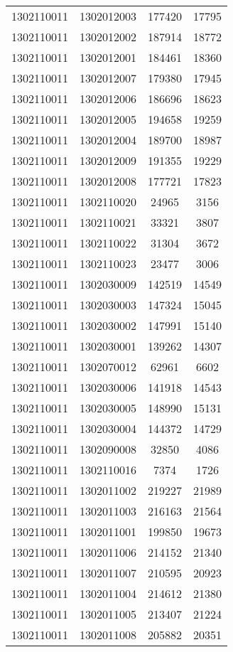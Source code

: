 \begin{longtable}[h]{llcc}
		1302110011 & 1302012003 & 177420 & 17795\\
		1302110011 & 1302012002 & 187914 & 18772\\
		1302110011 & 1302012001 & 184461 & 18360\\
		1302110011 & 1302012007 & 179380 & 17945\\
		1302110011 & 1302012006 & 186696 & 18623\\
		1302110011 & 1302012005 & 194658 & 19259\\
		1302110011 & 1302012004 & 189700 & 18987\\
		1302110011 & 1302012009 & 191355 & 19229\\
		1302110011 & 1302012008 & 177721 & 17823\\
		1302110011 & 1302110020 & 24965 & 3156\\
		1302110011 & 1302110021 & 33321 & 3807\\
		1302110011 & 1302110022 & 31304 & 3672\\
		1302110011 & 1302110023 & 23477 & 3006\\
		1302110011 & 1302030009 & 142519 & 14549\\
		1302110011 & 1302030003 & 147324 & 15045\\
		1302110011 & 1302030002 & 147991 & 15140\\
		1302110011 & 1302030001 & 139262 & 14307\\
		1302110011 & 1302070012 & 62961 & 6602\\
		1302110011 & 1302030006 & 141918 & 14543\\
		1302110011 & 1302030005 & 148990 & 15131\\
		1302110011 & 1302030004 & 144372 & 14729\\
		1302110011 & 1302090008 & 32850 & 4086\\
		1302110011 & 1302110016 & 7374 & 1726\\
		1302110011 & 1302011002 & 219227 & 21989\\
		1302110011 & 1302011003 & 216163 & 21564\\
		1302110011 & 1302011001 & 199850 & 19673\\
		1302110011 & 1302011006 & 214152 & 21340\\
		1302110011 & 1302011007 & 210595 & 20923\\
		1302110011 & 1302011004 & 214612 & 21380\\
		1302110011 & 1302011005 & 213407 & 21224\\
		1302110011 & 1302011008 & 205882 & 20351\\

\end{longtable}

